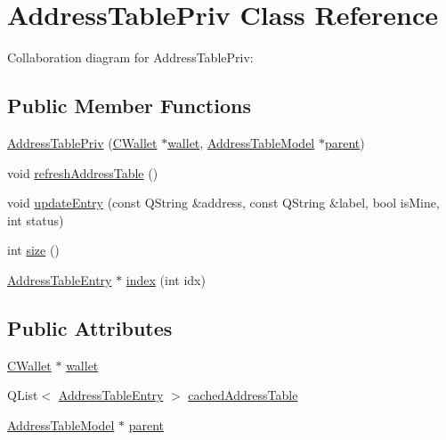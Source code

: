 \hypertarget{class_address_table_priv}{}\section{Address\+Table\+Priv Class Reference}
\label{class_address_table_priv}


Collaboration diagram for Address\+Table\+Priv\+:
\subsection*{Public Member Functions}
\begin{DoxyCompactItemize}
\item 
\hyperlink{class_address_table_priv_aebe853ef4b33ca8efbca40a7be59d139}{Address\+Table\+Priv} (\hyperlink{class_c_wallet}{C\+Wallet} $\ast$\hyperlink{class_address_table_priv_ad3506d642e5546251e76fbf0d75b2aca}{wallet}, \hyperlink{class_address_table_model}{Address\+Table\+Model} $\ast$\hyperlink{class_address_table_priv_ab0b98e86cab673315860630eafbd6561}{parent})
\item 
void \hyperlink{class_address_table_priv_af093c98444e8f734e08cfc2ce5b9b116}{refresh\+Address\+Table} ()
\item 
void \hyperlink{class_address_table_priv_aa0e92b8a58f68606b0fbb7faf04bda44}{update\+Entry} (const Q\+String \&address, const Q\+String \&label, bool is\+Mine, int status)
\item 
int \hyperlink{class_address_table_priv_a4f6133b3bf57ecb5a238698e27a2eb8d}{size} ()
\item 
\hyperlink{struct_address_table_entry}{Address\+Table\+Entry} $\ast$ \hyperlink{class_address_table_priv_af311eb7d0189a74a508d7ad0f563f307}{index} (int idx)
\end{DoxyCompactItemize}
\subsection*{Public Attributes}
\begin{DoxyCompactItemize}
\item 
\hyperlink{class_c_wallet}{C\+Wallet} $\ast$ \hyperlink{class_address_table_priv_ad3506d642e5546251e76fbf0d75b2aca}{wallet}
\item 
Q\+List$<$ \hyperlink{struct_address_table_entry}{Address\+Table\+Entry} $>$ \hyperlink{class_address_table_priv_a0ef3118dd421927db0ba41e2a27c40c7}{cached\+Address\+Table}
\item 
\hyperlink{class_address_table_model}{Address\+Table\+Model} $\ast$ \hyperlink{class_address_table_priv_ab0b98e86cab673315860630eafbd6561}{parent}
\end{DoxyCompactItemize}


